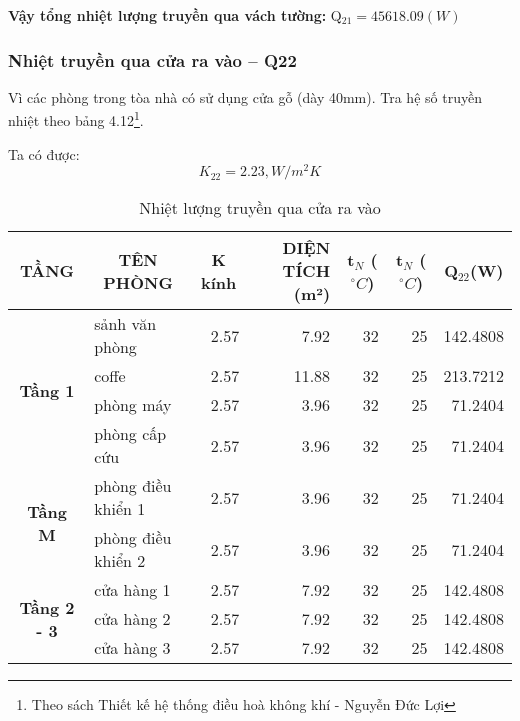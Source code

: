 \textbf{Vậy tổng nhiệt lượng truyền qua vách tường:} Q$_{21} = 45618.09(W)$

\subsubsection{Nhiệt truyền qua cửa ra vào -- Q{\scriptsize 22}}

Vì các phòng trong tòa nhà có sử dụng cửa gỗ (dày 40mm). Tra hệ số truyền nhiệt theo bảng 4.12\footnote{Theo sách Thiết kế hệ thống điều hoà không khí - Nguyễn Đức Lợi}.

Ta có được:
\begin{equation*}
	K_{22} = 2.23, W/m^2K
\end{equation*}
\newpage
\begin{table}[H]
	\centering
	\caption{Nhiệt lượng truyền qua cửa ra vào}
	\begin{adjustbox}{width=\textwidth}
	\begin{tabular}{|c|l|r|r|r|r|r|}
		\hline
		\textbf{ TẦNG} & \multicolumn{1}{c|}{\textbf{TÊN PHÒNG}} & \multicolumn{1}{c|}{\textbf{K kính}} & \multicolumn{1}{p{6.145em}|}{\textbf{DIỆN TÍCH (m²) }} & \multicolumn{1}{c|}{\textbf{t$_{N}$ ($^{\circ}C$)}} & \multicolumn{1}{c|}{\textbf{t$_{N}$ ($^{\circ}C$)}} & \multicolumn{1}{c|}{\textbf{Q$_{22}$(W)}} \bigstrut\\
		\hline
		\multirow{4}[8]{*}{\textbf{Tầng 1}} & sảnh văn phòng & 2.57  & 7.92  & 32    & 25    & 142.4808 \bigstrut\\
		\cline{2-7}          & coffe & 2.57  & 11.88 & 32    & 25    & 213.7212 \bigstrut\\
		\cline{2-7}          & phòng máy & 2.57  & 3.96  & 32    & 25    & 71.2404 \bigstrut\\
		\cline{2-7}          & phòng cấp cứu & 2.57  & 3.96  & 32    & 25    & 71.2404 \bigstrut\\
		\hline
		\multirow{2}[4]{*}{\textbf{Tầng M}} & phòng điều khiển 1 & 2.57  & 3.96  & 32    & 25    & 71.2404 \bigstrut\\
		\cline{2-7}          & phòng điều khiển 2 & 2.57  & 3.96  & 32    & 25    & 71.2404 \bigstrut\\
		\hline
		\multirow{6}[12]{*}{\textbf{Tầng 2 - 3}} & cửa hàng 1 & 2.57  & 7.92  & 32    & 25    & 142.4808 \bigstrut\\
		\cline{2-7}          & cửa hàng 2 & 2.57  & 7.92  & 32    & 25    & 142.4808 \bigstrut\\
		\cline{2-7}          & cửa hàng 3 & 2.57  & 7.92  & 32    & 25    & 142.4808 \bigstrut\\

\end{tabular}
\end{adjustbox}
\end{table}
